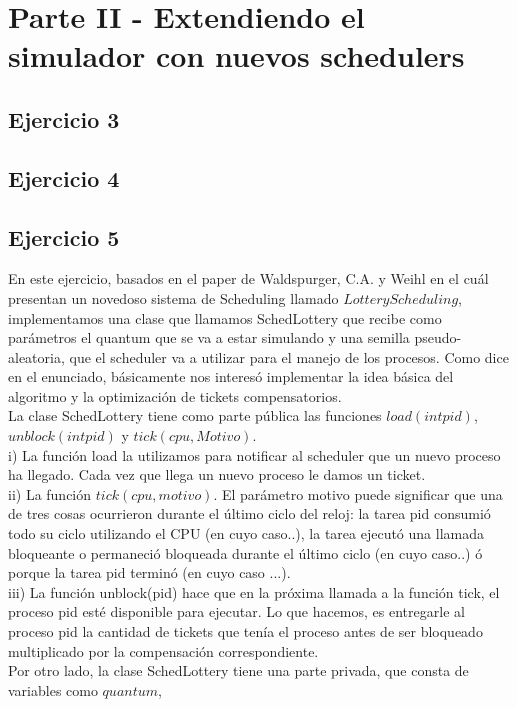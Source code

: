 \documentclass[a4paper]{article}
\begin{document}
\section{Parte II - Extendiendo el simulador con nuevos schedulers}

\subsection{Ejercicio 3}
\subsection{Ejercicio 4}
\subsection{Ejercicio 5}
En este ejercicio, basados en el paper de Waldspurger, C.A. y Weihl en el cu\'al presentan un 
novedoso sistema de Scheduling llamado $Lottery Scheduling$, implementamos una clase que llamamos
SchedLottery que recibe como par\'ametros el quantum que se va a estar simulando y una semilla 
pseudo-aleatoria, que el scheduler va a utilizar para el manejo de los procesos. Como dice en el
enunciado, b\'asicamente nos interes\'o implementar la idea b\'asica del algoritmo y la 
optimizaci\'on de tickets compensatorios. \\
La clase SchedLottery tiene como parte p\'ublica las funciones $load(int pid)$, $unblock(int pid)$ 
y $tick(cpu, Motivo)$. \\
i) La funci\'on load la utilizamos para notificar al scheduler
que un nuevo proceso ha llegado. Cada vez que llega un nuevo proceso le damos un ticket. \\
ii) La funci\'on
$tick(cpu, motivo)$. El par\'ametro motivo puede significar que una de tres cosas
ocurrieron durante el \'ultimo ciclo del reloj: la tarea pid consumi\'o todo su
ciclo utilizando el CPU (en cuyo caso..), la tarea ejecut\'o una llamada bloqueante o permaneci\'o
bloqueada durante el \'ultimo ciclo (en cuyo caso..) \'o porque la tarea pid termin\'o (en cuyo caso
...). \\
iii) La funci\'on unblock(pid) hace que en la pr\'oxima llamada a la funci\'on tick, el proceso pid 
est\'e disponible para ejecutar. Lo que hacemos, es entregarle al proceso pid la cantidad de tickets
que ten\'ia el proceso antes de ser bloqueado multiplicado por la compensaci\'on correspondiente. \\
Por otro lado, la clase SchedLottery tiene una parte privada, que consta de variables como $quantum$, 
\end{document}

